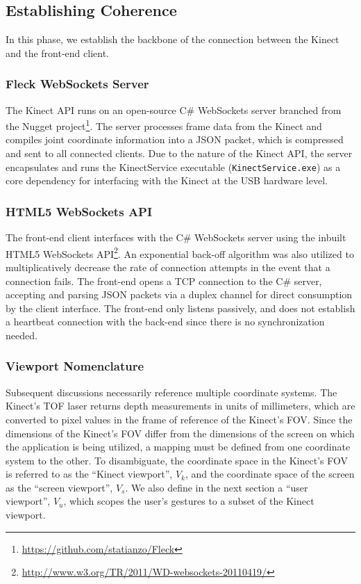 \documentclass{scrartcl}
\numberwithin{equation}{section}
\begin{document}
    \subsection{Establishing Coherence\label{sec:phase2}}
      In this phase, we establish the backbone of the connection between the Kinect and the front-end client.
      \subsubsection{Fleck WebSockets Server}
      The Kinect API runs on an open-source C\# WebSockets server branched from the Nugget project\footnote{\url{https://github.com/statianzo/Fleck}}. The server processes frame data from the Kinect and compiles joint coordinate information into a JSON packet, which is compressed and sent to all connected clients. Due to the nature of the Kinect API, the server encapsulates and runs the KinectService executable (\verb|KinectService.exe|) as a core dependency for interfacing with the Kinect at the USB hardware level.
      \subsubsection{HTML5 WebSockets API}
      The front-end client interfaces with the C\# WebSockets server using the inbuilt HTML5 WebSockets API\footnote{\url{http://www.w3.org/TR/2011/WD-websockets-20110419/}}. An exponential back-off algorithm was also utilized to multiplicatively decrease the rate of connection attempts in the event that a connection fails. The front-end opens a TCP connection to the C\# server, accepting and parsing JSON packets via a duplex channel for direct consumption by the client interface. The front-end only listens passively, and does not establish a heartbeat connection with the back-end since there is no synchronization needed.
      \subsubsection{Viewport Nomenclature}
      Subsequent discussions necessarily reference multiple coordinate systems. The Kinect's TOF laser returns depth measurements in units of millimeters, which are converted to pixel values in the frame of reference of the Kinect's FOV. Since the dimensions of the Kinect's FOV differ from the dimensions of the screen on which the application is being utilized, a mapping must be defined from one coordinate system to the other. To disambiguate, the coordinate space in the Kinect's FOV is referred to as the ``Kinect viewport'', $V_k$, and the coordinate space of the screen as the ``screen viewport'', $V_s$. We also define in the next section a ``user viewport'', $V_u$, which scopes the user's gestures to a subset of the Kinect viewport.
\end{document}
